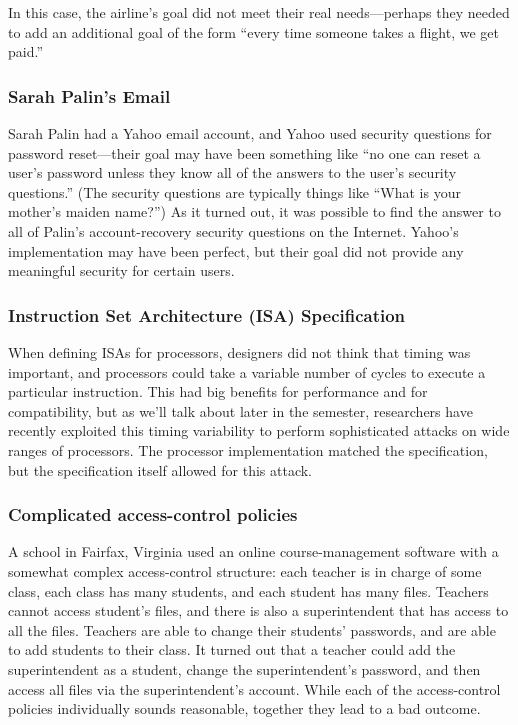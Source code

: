 In this case, the airline's goal did not meet
their real needs---perhaps they needed to add
an additional goal of the form ``every time someone takes a flight,
we get paid.''

\subsubsection{Sarah Palin's Email}
Sarah Palin had a Yahoo email account, and Yahoo
used security questions for password reset---their
goal may have been something like ``no one can
reset a user's password unless they know all of
the answers to the user's security questions.''
(The security questions are typically things like
``What is your mother's maiden name?'')
As it turned out, it was possible to find the answer
to all of Palin's account-recovery security questions 
on the Internet.\cite{palin}
Yahoo's implementation may have been perfect, but their
goal did not provide any meaningful security for certain users.

\subsubsection{Instruction Set Architecture (ISA) Specification}
When defining ISAs for processors, designers did
not think that timing was important, and
processors could take a variable number of cycles
to execute a particular instruction.
This had big benefits for performance and for
compatibility, but as we'll talk about later in
the semester, researchers have recently exploited
this timing variability to perform sophisticated
attacks on wide ranges of processors. The
processor implementation matched the
specification, but the specification itself
allowed for this attack.

\subsubsection{Complicated access-control policies}
A school in Fairfax, Virginia used an online
course-management software with a somewhat complex
access-control structure: each teacher is in charge of some
class, each class has many students, and each
student has many files. Teachers cannot access
student's files, and there is also
a superintendent that has access to all the files.
Teachers are able to change their students'
passwords, and are able to add students to their
class. It turned out that a teacher could add the
superintendent as a student, change the
superintendent's password, and then access all
files via the superintendent's account.
While each of the access-control policies individually
sounds reasonable, together they lead to a bad outcome.


